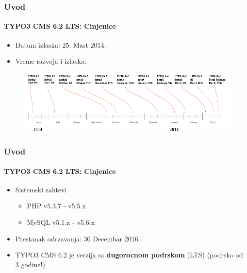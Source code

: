\begin{frame}[fragile]

	\frametitle{Uvod}
	\framesubtitle{TYPO3 CMS 6.2 LTS: Cinjenice}

	\begin{itemize}
		\item Datum izlaska: 25. Mart 2014.
		\item Vreme razvoja i izlaska:
	\end{itemize}

	\begin{figure}
		\includegraphics[width=0.99\linewidth]{Images/Introduction/ReleaseTimeline.png}
	\end{figure}

\end{frame}


\begin{frame}[fragile]
	\frametitle{Uvod}
	\framesubtitle{TYPO3 CMS 6.2 LTS: Cinjenice}

	\begin{itemize}
		\item Sistemski zahtevi
		\begin{itemize}
			\item PHP	\tabto{1.2cm} v5.3.7 - v5.5.x
			\item MySQL	\tabto{1.2cm} v5.1.x - v5.6.x
		\end{itemize}
	\end{itemize}

	\begin{itemize}
		\item Prestanak odrzavanja: 30 Decembar 2016
		\item TYPO3 CMS 6.2 je verzija sa \textbf{dugorocnom podrskom} (LTS) (podrska od 3 godine!)
	\end{itemize}

\end{frame}

